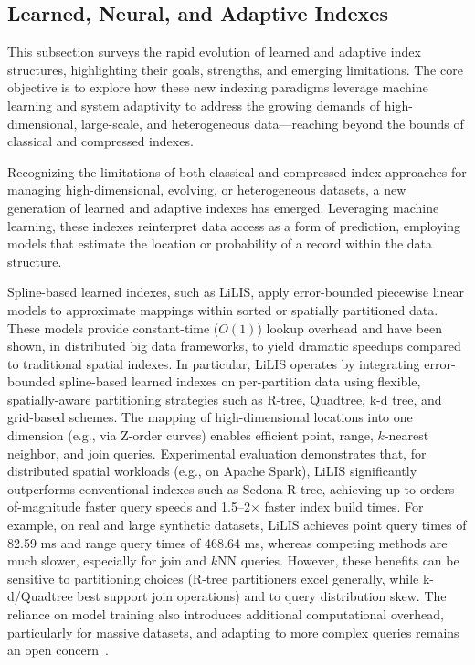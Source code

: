 \documentclass[sigconf]{acmart}
\begin{document}
\subsection{Learned, Neural, and Adaptive Indexes}

This subsection surveys the rapid evolution of learned and adaptive index structures, highlighting their goals, strengths, and emerging limitations. The core objective is to explore how these new indexing paradigms leverage machine learning and system adaptivity to address the growing demands of high-dimensional, large-scale, and heterogeneous data—reaching beyond the bounds of classical and compressed indexes.

Recognizing the limitations of both classical and compressed index approaches for managing high-dimensional, evolving, or heterogeneous datasets, a new generation of learned and adaptive indexes has emerged. Leveraging machine learning, these indexes reinterpret data access as a form of prediction, employing models that estimate the location or probability of a record within the data structure.

Spline-based learned indexes, such as LiLIS, apply error-bounded piecewise linear models to approximate mappings within sorted or spatially partitioned data. These models provide constant-time ($O(1)$) lookup overhead and have been shown, in distributed big data frameworks, to yield dramatic speedups compared to traditional spatial indexes. In particular, LiLIS operates by integrating error-bounded spline-based learned indexes on per-partition data using flexible, spatially-aware partitioning strategies such as R-tree, Quadtree, k-d tree, and grid-based schemes. The mapping of high-dimensional locations into one dimension (e.g., via Z-order curves) enables efficient point, range, $k$-nearest neighbor, and join queries. Experimental evaluation demonstrates that, for distributed spatial workloads (e.g., on Apache Spark), LiLIS significantly outperforms conventional indexes such as Sedona-R-tree, achieving up to orders-of-magnitude faster query speeds and 1.5--2$\times$ faster index build times. For example, on real and large synthetic datasets, LiLIS achieves point query times of 82.59 ms and range query times of 468.64 ms, whereas competing methods are much slower, especially for join and $k$NN queries. However, these benefits can be sensitive to partitioning choices (R-tree partitioners excel generally, while k-d/Quadtree best support join operations) and to query distribution skew. The reliance on model training also introduces additional computational overhead, particularly for massive datasets, and adapting to more complex queries remains an open concern~\cite{ref110,ref111}.
\end{document}
